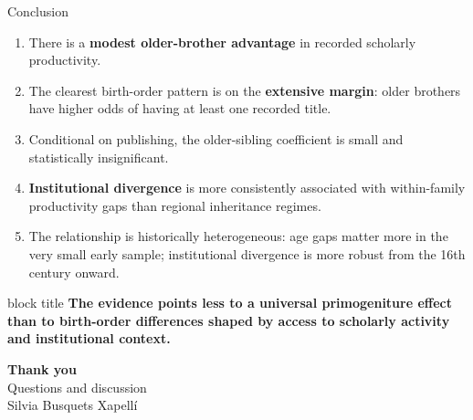 \documentclass[aspectratio=169,10pt]{beamer}
\newcommand{\bigclaim}[1]{%
  \begin{beamercolorbox}[wd=\linewidth,sep=0.7em,rounded=true]{block title}%
  \color{white}\large\bfseries #1
  \end{beamercolorbox}}
\begin{document}
\begin{frame}{Conclusion}
\begin{enumerate}
  \item There is a \textbf{modest older-brother advantage} in recorded scholarly productivity.
  \item The clearest birth-order pattern is on the \textbf{extensive margin}: older brothers have higher odds of having at least one recorded title.
  \item Conditional on publishing, the older-sibling coefficient is small and statistically insignificant.
  \item \textbf{Institutional divergence} is more consistently associated with within-family productivity gaps than regional inheritance regimes.
  \item The relationship is historically heterogeneous: age gaps matter more in the very small early sample; institutional divergence is more robust from the 16th century onward.
\end{enumerate}

\vspace{0.5em}
\bigclaim{The evidence points less to a universal primogeniture effect than to birth-order differences shaped by access to scholarly activity and institutional context.}
\end{frame}

\begin{frame}[plain]
\begin{center}
\vspace{2.0em}
{\Huge\color{FormalNavy}\textbf{Thank you}}\\[1.2em]
{\Large Questions and discussion}\\[1.8em]
{\small Silvia Busquets Xapellí}
\end{center}
\end{frame}

\appendix
\end{document}
